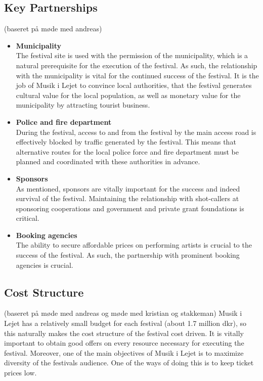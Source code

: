\subsection{Key Partnerships} %
\label{sub:key_partnerships}
(baseret på møde med andreas)
\begin{itemize}
	\item \textbf{Municipality}\\
	The festival site is used with the permission of the municipality, which is a natural prerequisite for the execution of the festival. As such, the relationship with the municipality is vital for the continued success of the festival. It is the job of Musik i Lejet to convince local authorities, that the festival generates cultural value for the local population, as well as monetary value for the municipality  by attracting tourist business.
	\item \textbf{Police and fire department}\\
	During the festival, access to and from the festival by the main access road is effectively blocked by traffic generated by the festival. This means that alternative routes for the local police force and fire department must be planned and coordinated with these authorities in advance.
	\item \textbf{Sponsors}\\
	As mentioned, sponsors are vitally important for the success and indeed survival of the festival. Maintaining the relationship with shot-callers at sponsoring cooperations and government and private grant foundations is critical.
	\item \textbf{Booking agencies}\\
	The ability to secure affordable prices on performing artists is crucial to the success of the festival. As such, the partnership with prominent booking agencies is crucial.
\end{itemize}

\subsection{Cost Structure} %
\label{sub:cost_structure}
(baseret på møde med andreas og møde med kristian og stakkeman)
Musik i Lejet has a relatively small budget for each festival (about 1.7 million dkr), so this naturally makes the cost structure of the festival cost driven. It is vitally important to obtain good offers on every resource necessary for executing the festival. Moreover, one of the main objectives of Musik i Lejet is to maximize diversity of the festivals audience. One of the ways of doing this is to keep ticket prices low.